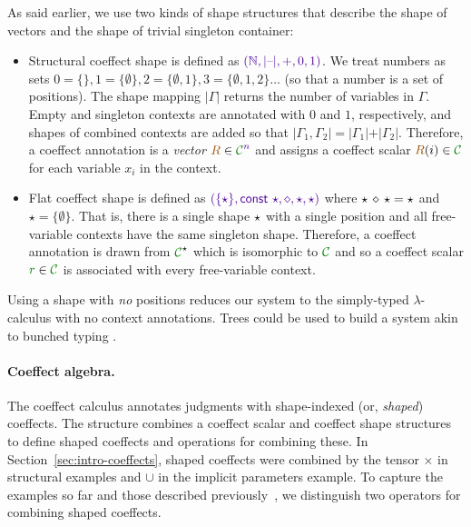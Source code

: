 \noindent
As said earlier, we use two kinds of shape structures that describe the shape
of vectors and the shape of trivial singleton container: 

\begin{itemize}
\item
Structural coeffect shape is defined as $\sclrd{(\mathbb{N}, {|}\textnormal{--}{|}, +, 0, 1)}$.
We treat numbers as sets $0 = \{\}, 1=\{ \emptyset \}, 2=\{ \emptyset, 1\}, 3=\{\emptyset, 1, 2 \} \ldots$ 
(so that a number is a set of positions). The shape mapping ${|}\Gamma{|}$ returns the number
of variables in $\Gamma$. Empty and singleton contexts are annotated with $0$ and $1$, respectively,
and shapes of combined contexts are added so that ${|}\Gamma_1, \Gamma_2{|} = {|}\Gamma_1{|} + {|}\Gamma_2{|}$.
Therefore, a coeffect annotation is a \emph{vector} $\aclrd{R} \in
\C^{\sclrd{n}}$ and assigns a coeffect scalar $\aclrd{R}(i) \in \C$ for each
variable $x_i$ in the context.

\item
Flat coeffect shape is defined as $\sclrd{(\{\sflat \}, \mathsf{const}\,\,\sflat, \diamond, \sflat, \sflat)}$ where
$\star\,\diamond\,\star = \star$ and $\star=\{\emptyset\}$. That is, there is a single shape
$\star$ with a single position and all free-variable contexts have the same singleton shape.
Therefore, a coeffect annotation is drawn from $\C^{\sflat}$ which is iso\-morphic to $\C$
and so a coeffect scalar $\cclrd{r}\in \C$ is associated with every free-variable context.
\end{itemize}

\noindent
Using a shape with \emph{no} positions reduces our system to the simply-typed $\lambda$-calculus with no context annotations.
Trees could be used to build a system akin to bunched typing \cite{substruct-bunched}.

\paragraph{Coeffect algebra.}
The coeffect calculus annotates judgments with 
shape-indexed (or, \emph{shaped}) coeffects.
The \emph{} structure combines a coeffect scalar and coeffect shape structures
to define shaped coeffects and operations for combining these.
In Section~\ref{sec:intro-coeffects}, shaped coeffects were combined
by the tensor $\times$ in structural examples and
$\cup$ in the implicit parameters example. To capture the examples so far and
those described previously~\cite{petricek2013coeffects}, we distinguish two
operators for combining shaped coeffects. 

